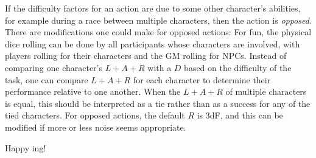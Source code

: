If the difficulty factors for an action are due to some other character's abilities, for example during a race between multiple characters, then the action is \emph{opposed}.
There are modifications one could make for opposed actions:
For fun, the physical dice rolling can be done by all participants whose characters are involved, with players rolling for their characters and the GM rolling for NPCs.
Instead of comparing one character’s $L + A + R$ with a $D$ based on the difficulty of the task, one can compare $L + A + R$ for each character to determine their performance relative to one another.
When the $L + A + R$ of multiple characters is equal, this should be interpreted as a tie rather than as a success for any of the tied characters.
For opposed actions, the default $R$ is $3$dF, and this can be modified if more or less noise seems appropriate.

Happy \peupfudge{}ing!

